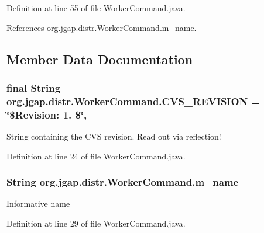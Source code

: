 Definition at line 55 of file Worker\-Command.\-java.



References org.\-jgap.\-distr.\-Worker\-Command.\-m\-\_\-name.



\subsection{Member Data Documentation}
\hypertarget{classorg_1_1jgap_1_1distr_1_1_worker_command_a9e60b27253d1b535742ac3d70c29f942}{
\subsubsection[{C\-V\-S\-\_\-\-R\-E\-V\-I\-S\-I\-O\-N}]{\setlength{\rightskip}{0pt plus 5cm}final String org.\-jgap.\-distr.\-Worker\-Command.\-C\-V\-S\-\_\-\-R\-E\-V\-I\-S\-I\-O\-N = \char`\"{}\$Revision\-: 1. \$\char`\"{}\hspace{0.3cm}{\ttfamily [static]}, {\ttfamily [private]}}}\label{classorg_1_1jgap_1_1distr_1_1_worker_command_a9e60b27253d1b535742ac3d70c29f942}
String containing the C\-V\-S revision. Read out via reflection! 

Definition at line 24 of file Worker\-Command.\-java.

\hypertarget{classorg_1_1jgap_1_1distr_1_1_worker_command_a20aded8f8b9284d1d12d600251b9c023}{
\subsubsection[{m\-\_\-name}]{\setlength{\rightskip}{0pt plus 5cm}String org.\-jgap.\-distr.\-Worker\-Command.\-m\-\_\-name\hspace{0.3cm}{\ttfamily [private]}}}\label{classorg_1_1jgap_1_1distr_1_1_worker_command_a20aded8f8b9284d1d12d600251b9c023}
Informative name 

Definition at line 29 of file Worker\-Command.\-java.



